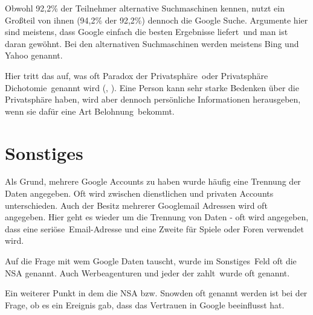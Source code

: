 Obwohl 92,2\% der Teilnehmer alternative Suchmaschinen kennen, nutzt ein Großteil von ihnen (94,2\% der 92,2\%) dennoch die Google Suche. Argumente hier sind meistens, dass Google \glqq einfach die besten Ergebnisse liefert\grqq\ und \glqq man ist daran gewöhnt\grqq . Bei den alternativen Suchmaschinen werden meistens Bing und Yahoo genannt.

Hier tritt das auf, was oft \glqq Paradox der Privatsphäre\grqq\ oder \glqq Privatsphäre Dichotomie\grqq\ genannt wird (\citet{lbs2006}, \citet{privacyparadox2006}). Eine Person kann sehr starke Bedenken über die Privatsphäre haben, wird aber dennoch persönliche Informationen herausgeben, wenn sie dafür eine Art \glqq Belohnung\grqq\ bekommt.

\section{Sonstiges}
Als Grund, mehrere Google Accounts zu haben wurde häufig eine Trennung der Daten angegeben. Oft wird zwischen dienstlichen und privaten Accounts unterschieden. Auch der Besitz mehrerer Googlemail Adressen wird oft angegeben. Hier geht es wieder um die Trennung von Daten - oft wird angegeben, dass eine \glqq seriöse\grqq\ Email-Adresse und eine Zweite für Spiele oder Foren verwendet wird.

Auf die Frage mit wem Google Daten tauscht, wurde im \glqq Sonstiges\grqq\ Feld oft die NSA genannt. Auch Werbeagenturen und \glqq jeder der zahlt\grqq\ wurde oft genannt. 

Ein weiterer Punkt in dem die NSA bzw. Snowden oft genannt werden ist bei der Frage, ob es ein Ereignis gab, dass das Vertrauen in Google beeinflusst hat. 